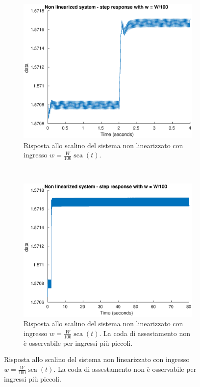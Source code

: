 \documentclass[a4paper]{article}
\DeclareMathOperator*{\sca}{\textrm{sca}}
\begin{document}
\begin{figure}
\centering
\begin{subfigure}[t]{0.48\textwidth}
    \centering
    \includegraphics[width=\textwidth]{step_small_nonlin_short}
    \caption{Risposta allo scalino del sistema non linearizzato con ingresso $w = \frac{W}{100} \sca (t)$.}
    \label{fig:step_small_sim_nonlin_short}
\end{subfigure}
~
\begin{subfigure}[t]{0.48\textwidth}
    \centering
    \includegraphics[width=\textwidth]{step_small_nonlin_long}
    \caption{Risposta allo scalino del sistema non linearizzato con ingresso $w = \frac{W}{100} \sca (t)$. La coda di assestamento non è osservabile per ingressi più piccoli.}
    \label{fig:step_small_sim_nonlin_long}
\end{subfigure}
\end{figure}
\end{document}
